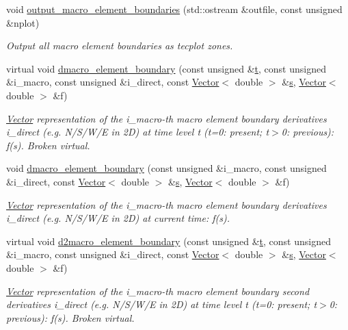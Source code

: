 \begin{DoxyCompactItemize}
void \hyperlink{classoomph_1_1Domain_a59dfe3a2cff10aa2e12f86dba9584f15}{output\+\_\+macro\+\_\+element\+\_\+boundaries} (std\+::ostream \&outfile, const unsigned \&nplot)
\begin{DoxyCompactList}\small\item\em Output all macro element boundaries as tecplot zones. \end{DoxyCompactList}\item 
virtual void \hyperlink{classoomph_1_1Domain_ae573c54363a8e9d33951e59208a9bc39}{dmacro\+\_\+element\+\_\+boundary} (const unsigned \&\hyperlink{cfortran_8h_af6f0bd3dc13317f895c91323c25c2b8f}{t}, const unsigned \&i\+\_\+macro, const unsigned \&i\+\_\+direct, const \hyperlink{classoomph_1_1Vector}{Vector}$<$ double $>$ \&\hyperlink{cfortran_8h_ab7123126e4885ef647dd9c6e3807a21c}{s}, \hyperlink{classoomph_1_1Vector}{Vector}$<$ double $>$ \&f)
\begin{DoxyCompactList}\small\item\em \hyperlink{classoomph_1_1Vector}{Vector} representation of the i\+\_\+macro-\/th macro element boundary derivatives i\+\_\+direct (e.\+g. N/\+S/\+W/E in 2D) at time level t (t=0\+: present; t$>$0\+: previous)\+: f(s). Broken virtual. \end{DoxyCompactList}\item 
void \hyperlink{classoomph_1_1Domain_a6973f0ef86b83c6cadcd722374c62270}{dmacro\+\_\+element\+\_\+boundary} (const unsigned \&i\+\_\+macro, const unsigned \&i\+\_\+direct, const \hyperlink{classoomph_1_1Vector}{Vector}$<$ double $>$ \&\hyperlink{cfortran_8h_ab7123126e4885ef647dd9c6e3807a21c}{s}, \hyperlink{classoomph_1_1Vector}{Vector}$<$ double $>$ \&f)
\begin{DoxyCompactList}\small\item\em \hyperlink{classoomph_1_1Vector}{Vector} representation of the i\+\_\+macro-\/th macro element boundary derivatives i\+\_\+direct (e.\+g. N/\+S/\+W/E in 2D) at current time\+: f(s). \end{DoxyCompactList}\item 
virtual void \hyperlink{classoomph_1_1Domain_afeeb40f9179abe710f14effbe4db42a1}{d2macro\+\_\+element\+\_\+boundary} (const unsigned \&\hyperlink{cfortran_8h_af6f0bd3dc13317f895c91323c25c2b8f}{t}, const unsigned \&i\+\_\+macro, const unsigned \&i\+\_\+direct, const \hyperlink{classoomph_1_1Vector}{Vector}$<$ double $>$ \&\hyperlink{cfortran_8h_ab7123126e4885ef647dd9c6e3807a21c}{s}, \hyperlink{classoomph_1_1Vector}{Vector}$<$ double $>$ \&f)
\begin{DoxyCompactList}\small\item\em \hyperlink{classoomph_1_1Vector}{Vector} representation of the i\+\_\+macro-\/th macro element boundary second derivatives i\+\_\+direct (e.\+g. N/\+S/\+W/E in 2D) at time level t (t=0\+: present; t$>$0\+: previous)\+: f(s). Broken virtual. \end{DoxyCompactList}\item 

\end{DoxyCompactItemize}

